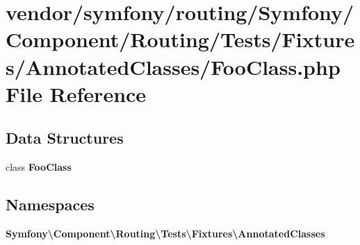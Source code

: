\section{vendor/symfony/routing/\+Symfony/\+Component/\+Routing/\+Tests/\+Fixtures/\+Annotated\+Classes/\+Foo\+Class.php File Reference}
\label{_foo_class_8php}
\subsection*{Data Structures}
\begin{DoxyCompactItemize}
\item 
class {\bf Foo\+Class}
\end{DoxyCompactItemize}
\subsection*{Namespaces}
\begin{DoxyCompactItemize}
\item 
 {\bf Symfony\textbackslash{}\+Component\textbackslash{}\+Routing\textbackslash{}\+Tests\textbackslash{}\+Fixtures\textbackslash{}\+Annotated\+Classes}
\end{DoxyCompactItemize}
